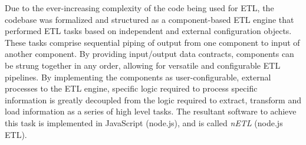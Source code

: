 Due to the ever-increasing complexity of the code being used for ETL, the codebase was formalized and structured as a component-based ETL engine that performed ETL tasks based on independent and external configuration objects. These tasks comprise sequential piping of output from one component to input of another component. By providing input/output data contracts, components can be strung together in any order, allowing for versatile and configurable ETL pipelines. By implementing the components as user-configurable, external processes to the ETL engine, specific logic required to process specific information is greatly decoupled from the logic required to extract, transform and load information as a series of high level tasks. The resultant software to achieve this task is implemented in JavaScript (node.js), and is called \textit{nETL} (node.js ETL).

